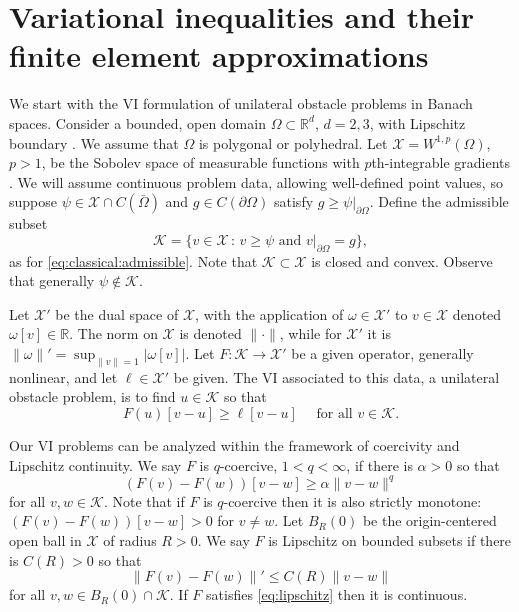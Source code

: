 \documentclass[]{interact}
\theoremstyle{plain}%
\theoremstyle{definition}
\theoremstyle{remark}
\newcommand{\RR}{\mathbb{R}}
\newcommand{\cK}{\mathcal{K}}
\newcommand{\cX}{\mathcal{X}}
\begin{document}
\section{Variational inequalities and their finite element approximations} \label{sec:vifem}

We start with the VI formulation of unilateral obstacle problems in Banach spaces.  Consider a bounded, open domain $\Omega \subset \RR^d$, $d=2,3$, with Lipschitz boundary \cite{Ciarlet2002}.  We assume that $\Omega$ is polygonal or polyhedral.  Let $\cX = W^{1,p}(\Omega)$, $p>1$, be the Sobolev space of measurable functions with $p$th-integrable gradients \cite{Evans2010}.  We will assume continuous problem data, allowing well-defined point values, so suppose $\psi \in \cX \cap C(\bar\Omega)$ and $g\in C(\partial \Omega)$ satisfy $g \ge \psi|_{\partial\Omega}$.  Define the admissible subset
\begin{equation} \label{eq:admissible}
\cK = \{v \in \cX \,:\, v \ge \psi \text{ and } v|_{\partial \Omega} = g\},
\end{equation}
as for \eqref{eq:classical:admissible}.  Note that $\cK\subset \cX$ is closed and convex.  Observe that generally $\psi\notin\cK$.

Let $\cX'$ be the dual space of $\cX$, with the application of $\omega \in \cX'$ to $v\in \cX$ denoted $\omega[v] \in \RR$.  The norm on $\cX$ is denoted $\|\cdot\|$, while for $\cX'$ it is $\|\omega\|' = \sup_{\|v\|=1} |\omega[v]|$.  Let $F:\cK \to \cX'$ be a given operator, generally nonlinear, and let $\ell\in \cX'$ be given.  The VI associated to this data, a unilateral obstacle problem, is to find $u\in \cK$ so that
\begin{equation} \label{eq:vi}
F(u)[v - u] \ge \ell[v - u] \quad \text{ for all } v \in \cK.
\end{equation}

Our VI problems can be analyzed within the framework of coercivity and Lipschitz continuity.  We say $F$ is $q$-coercive, $1<q<\infty$, if there is $\alpha>0$ so that
\begin{equation} \label{eq:coercive}
(F(v) - F(w))[v - w] \ge \alpha \|v-w\|^q
\end{equation}
for all $v,w \in \cK$.  Note that if $F$ is $q$-coercive then it is also strictly monotone: $(F(v) - F(w))[v - w] > 0$ for $v\ne w$.  Let $B_R(0)$ be the origin-centered open ball in $\cX$ of radius $R>0$.  We say $F$ is Lipschitz on bounded subsets if there is $C(R)>0$ so that
\begin{equation} \label{eq:lipschitz}
\|F(v)-F(w)\|' \le C(R) \|v-w\|
\end{equation}
for all $v,w \in B_R(0)\cap \cK$.  If $F$ satisfies \eqref{eq:lipschitz} then it is continuous.
\end{document}
